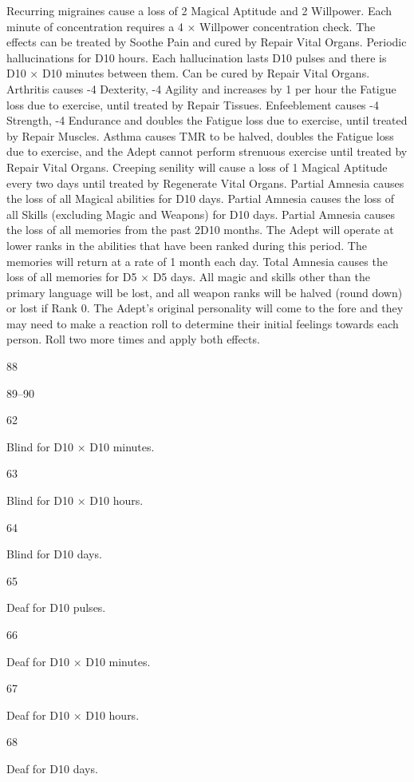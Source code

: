 \documentclass[a4paper]{article}
\begin{document}
\begin{multicols}{3}
Recurring migraines cause a loss of 2
Magical Aptitude and 2 Willpower. Each
minute of concentration requires a 4 ×
Willpower concentration check. The effects can be treated by Soothe Pain and
cured by Repair Vital Organs.
Periodic hallucinations for D10 hours.
Each hallucination lasts D10 pulses and
there is D10 × D10 minutes between
them. Can be cured by Repair Vital Organs.
Arthritis causes -4 Dexterity, -4 Agility
and increases by 1 per hour the Fatigue
loss due to exercise, until treated by Repair Tissues.
Enfeeblement causes -4 Strength, -4 Endurance and doubles the Fatigue loss due
to exercise, until treated by Repair Muscles.
Asthma causes TMR to be halved, doubles the Fatigue loss due to exercise, and
the Adept cannot perform strenuous exercise until treated by Repair Vital Organs.
Creeping senility will cause a loss of 1
Magical Aptitude every two days until
treated by Regenerate Vital Organs.
Partial Amnesia causes the loss of all
Magical abilities for D10 days.
Partial Amnesia causes the loss of all
Skills (excluding Magic and Weapons) for
D10 days.
Partial Amnesia causes the loss of all
memories from the past 2D10 months.
The Adept will operate at lower ranks in
the abilities that have been ranked during
this period. The memories will return at a
rate of 1 month each day.
Total Amnesia causes the loss of all
memories for D5 × D5 days. All magic
and skills other than the primary language
will be lost, and all weapon ranks will be
halved (round down) or lost if Rank 0.
The Adept’s original personality will
come to the fore and they may need to
make a reaction roll to determine their
initial feelings towards each person.
Roll two more times and apply both effects.

88

89–90

62

Blind for D10 × D10 minutes.

63

Blind for D10 × D10 hours.

64

Blind for D10 days.

65

Deaf for D10 pulses.

66

Deaf for D10 × D10 minutes.

67

Deaf for D10 × D10 hours.

68

Deaf for D10 days.


\end{multicols}
\end{document}
